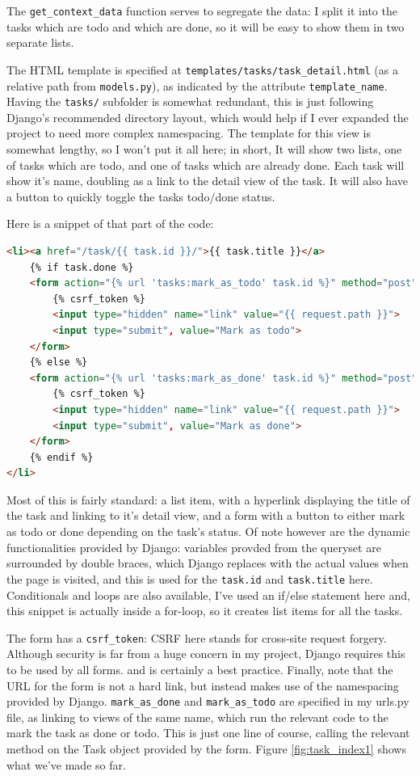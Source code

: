 \documentclass{article}
\begin{document}
The \texttt{get\_context\_data} function serves to segregate the data:
I split it into the tasks which are todo and which are done,
so it will be easy to show them in two separate lists.

The HTML template is specified at \texttt{templates/tasks/task\_detail.html}
(as a relative path from \texttt{models.py}),
as indicated by the attribute \texttt{template\_name}.
Having the \texttt{tasks/} subfolder is somewhat redundant,
this is just following Django's recommended directory layout,
which would help if I ever expanded the project to need more complex namespacing.
The template for this view is somewhat lengthy,
so I won't put it all here;
in short,
It will show two lists,
one of tasks which are todo,
and one of tasks which are already done.
Each task will show it's name,
doubling as a link to the detail view of the task.
It will also have a button to quickly toggle the tasks todo/done status.

Here is a snippet of that part of the code:
\begin{lstlisting}[language=HTML, breaklines]
<li><a href="/task/{{ task.id }}/">{{ task.title }}</a>
    {% if task.done %}
    <form action="{% url 'tasks:mark_as_todo' task.id %}" method="post">
        {% csrf_token %}
        <input type="hidden" name="link" value="{{ request.path }}">
        <input type="submit", value="Mark as todo">
    </form>
    {% else %}
    <form action="{% url 'tasks:mark_as_done' task.id %}" method="post">
        {% csrf_token %}
        <input type="hidden" name="link" value="{{ request.path }}">
        <input type="submit", value="Mark as done">
    </form>
    {% endif %}
</li>
\end{lstlisting}

Most of this is fairly standard:
a list item,
with a hyperlink displaying the title of the task and linking to it's detail view,
and a form with a button to either mark as todo or done depending on the task's status.
Of note however are the dynamic functionalities provided by Django:
variables provded from the queryset are surrounded by double braces,
which Django replaces with the actual values when the page is visited,
and this is used for the \texttt{task.id} and \texttt{task.title} here.
Conditionals and loops are also available,
I've used an if/else statement here and,
this snippet is actually inside a for-loop,
so it creates list items for all the tasks.

The form has a \texttt{csrf\_token}:
CSRF here stands for cross-site request forgery.
Although security is far from a huge concern in my project,
Django requires this to be used by all forms.
and is certainly a best practice.
Finally, note that the URL for the form is not a hard link,
but instead makes use of the namespacing provided by Django.
\texttt{mark\_as\_done} and \texttt{mark\_as\_todo} are specified in my urls.py file,
as linking to views of the same name,
which run the relevant code to the mark the task as done or todo.
This is just one line of course,
calling the relevant method on the Task object provided by the form.
Figure \ref{fig:task_index1} shows what we've made so far.
\end{document}
